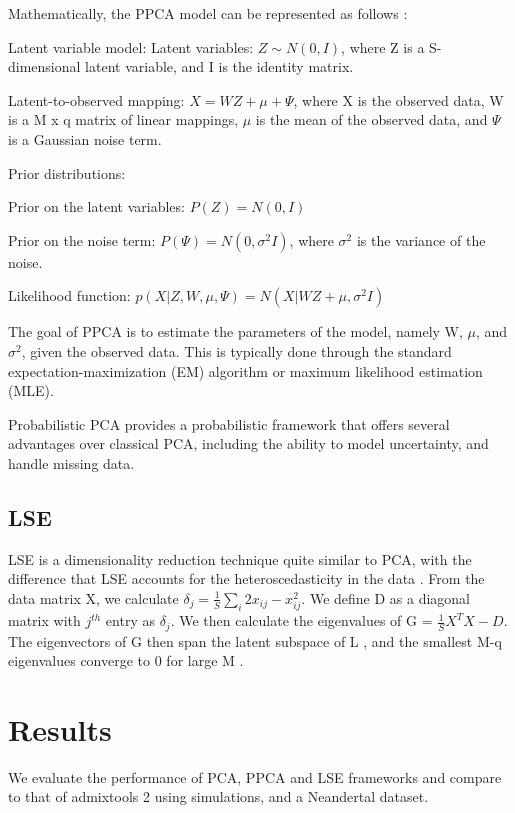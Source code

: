 \documentclass[12pt, letterpaper]{article}
\begin{document}
Mathematically, the PPCA model can be represented as follows \cite{tipping_probabilistic_nodate}:

Latent variable model:
Latent variables: $Z \sim N(0, I)$, where Z is a S-dimensional latent variable, and I is the identity matrix.

Latent-to-observed mapping: $X = WZ + \mu + \Psi$, where X is the observed data, W is a M x q matrix of linear mappings, $\mu$ is the mean of the observed data, and $\Psi$ is a Gaussian noise term.

Prior distributions:

Prior on the latent variables: $P(Z) = N(0, I)$

Prior on the noise term: $P(\Psi) = N(0, \sigma^2I)$, where $\sigma^2$ is the variance of the noise.

Likelihood function:
$p(X|Z, W, \mu, \Psi) = N(X|WZ + \mu, \sigma^2I)$

The goal of PPCA is to estimate the parameters of the model, namely W, $\mu$, and $\sigma^2$, given the observed data. This is typically done through the standard expectation-maximization (EM) algorithm or maximum likelihood estimation (MLE).

Probabilistic PCA provides a probabilistic framework that offers several advantages over classical PCA, including the ability to model uncertainty, and handle missing data. 

\subsection{LSE}

LSE is a dimensionality reduction technique quite similar to PCA, with the difference that LSE accounts for the heteroscedasticity in the data \cite{chen_consistent_2015}. From the data matrix X, we calculate $\delta_j = \frac{1}{S}\sum_i2x_{ij} - x_{ij}^2$. We define D as a diagonal matrix with $j^{th}$ entry as $\delta_j$. We then calculate the eigenvalues of G = $\frac{1}{S}X^TX - D$. The eigenvectors of G then span the latent subspace of L , and the smallest M-q eigenvalues converge to 0 for large M \cite{cabreros_likelihood-free_2019}. 


\section{Results}

We evaluate the performance of PCA, PPCA and LSE frameworks and compare to that of admixtools 2 using simulations, and a Neandertal dataset. 
\end{document}

